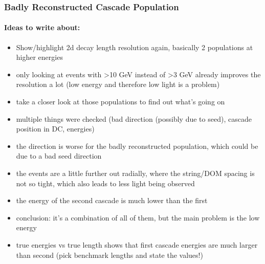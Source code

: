\subsubsection{Badly Reconstructed Cascade Population}

\paragraph{Ideas to write about:}
\begin{itemize}
    \item Show/highlight 2d decay length resolution again, basically 2 populations at higher energies
    \item only looking at events with >10 GeV instead of >3 GeV already improves the resolution a lot (low energy and therefore low light is a problem)
    \item take a closer look at those populations to find out what's going on
    \item multiple things were checked (bad direction (possibly due to seed), cascade position in DC, energies)
    \item the direction is worse for the badly reconstructed population, which could be due to a bad seed direction
    \item the events are a little further out radially, where the string/DOM spacing is not so tight, which also leads to less light being observed
    \item the energy of the second cascade is much lower than the first
    \item conclusion: it's a combination of all of them, but the main problem is the low energy
    \item true energies vs true length shows that first cascade energies are much larger than second (pick benchmark lengths and state the values!)
\end{itemize}

